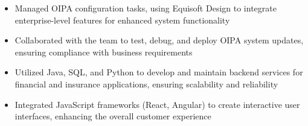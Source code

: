 \par\bigskip
{}
\par\smallskip
\begin{minipage}{13.75cm}
  \begin{minipage}{6.5cm}
    \begin{itemize}
      \item Managed OIPA configuration tasks, using Equisoft Design to integrate enterprise-level features for enhanced system functionality
      \item Collaborated with the team to test, debug, and deploy OIPA system updates, ensuring compliance with business requirements
    \end{itemize}
  \end{minipage}
  \hfill
  \begin{minipage}{6.5cm}
    \begin{itemize}
      \item Utilized Java, SQL, and Python to develop and maintain backend services for financial and insurance applications, ensuring scalability and reliability
      \item Integrated JavaScript frameworks (React, Angular) to create interactive user interfaces, enhancing the overall customer experience
    \end{itemize}
  \end{minipage}
\end{minipage}
\par\smallskip
\divider

